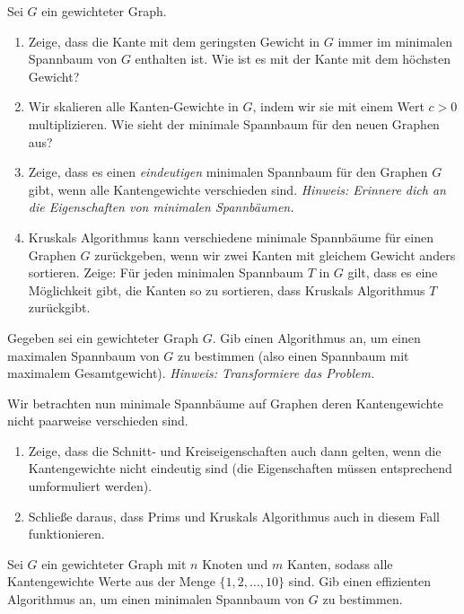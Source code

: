 \documentclass{uebung_cs}
\begin{document}
\begin{aufgabe}
	Sei $G$ ein gewichteter Graph.
	\begin{enumerate}
		\item Zeige, dass die Kante mit dem geringsten Gewicht in $G$ immer im minimalen Spannbaum von $G$ enthalten ist.
		Wie ist es mit der Kante mit dem höchsten Gewicht? 
		\item Wir skalieren alle Kanten-Gewichte in $G$, indem wir sie mit einem Wert $c>0$ multiplizieren.
		Wie sieht der minimale Spannbaum für den neuen Graphen aus?
		\item Zeige, dass es einen \emph{eindeutigen} minimalen Spannbaum für den Graphen $G$ gibt, wenn alle Kantengewichte verschieden sind.
		\textit{Hinweis: Erinnere dich an die Eigenschaften von minimalen Spannbäumen.}
		\item Kruskals Algorithmus kann verschiedene minimale Spannbäume für einen Graphen $G$ zurückgeben, wenn wir zwei Kanten mit gleichem Gewicht anders sortieren.
		Zeige: Für jeden minimalen Spannbaum $T$ in $G$ gilt, dass es eine Möglichkeit gibt, die Kanten so zu sortieren, dass Kruskals Algorithmus $T$ zurückgibt.
	\end{enumerate}
\end{aufgabe}


\begin{aufgabe}
	Gegeben sei ein gewichteter Graph $G$. Gib einen Algorithmus an, um einen maximalen Spannbaum von $G$ zu bestimmen (also einen Spannbaum mit maximalem Gesamtgewicht).
	\emph{Hinweis: Transformiere das Problem.}
\end{aufgabe}


\begin{aufgabe}
	Wir betrachten nun minimale Spannbäume auf Graphen deren Kantengewichte nicht paarweise verschieden sind.
	\begin{enumerate}
		\item Zeige, dass die Schnitt- und Kreiseigenschaften auch dann gelten, wenn die Kantengewichte nicht eindeutig sind (die Eigenschaften müssen entsprechend umformuliert werden).
		\item Schließe daraus, dass Prims und Kruskals Algorithmus auch in diesem Fall funktionieren.
	\end{enumerate}
\end{aufgabe}

\begin{aufgabe}
	Sei $G$ ein gewichteter Graph mit $n$ Knoten und $m$ Kanten, sodass alle Kantengewichte Werte aus der Menge $\{ 1, 2, \ldots , 10\}$ sind.
	Gib einen effizienten Algorithmus an, um einen minimalen Spannbaum von $G$ zu bestimmen.
\end{aufgabe}
\end{document}
